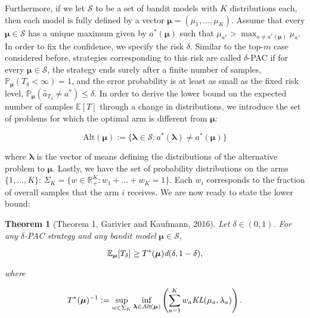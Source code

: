 \documentclass[11pt,]{article}
\newtheorem{theorem}{Theorem}
\begin{document}
Furthermore, if we let \(\mathcal{S}\) to be a set of bandit models with
\(K\) distributions each, then each model is fully defined by a vector
\(\bm{\mu} = (\mu_1, \dots, \mu_K)\). Assume that every
\(\bm{\mu} \in \mathcal{S}\) has a unique maximum given by
\(a^*(\bm{\mu})\) such that
\(\mu_{a^*} > \max_{a \neq a^*(\bm{\mu})} \mu_a\). In order to fix the
confidence, we specify the risk \(\delta\). Similar to the top-\(m\)
case considered before, strategies corresponding to this risk are called
\(\delta\)-PAC if for every \(\bm{\mu} \in \mathcal{S}\), the strategy
ends surely after a finite number of samples,
\(\mathbb{P}_{\bm{\mu}}(T_{\delta} < \infty) = 1\), and the error
probability is at least as small as the fixed risk level,
\(\mathbb{P}_{\bm{\mu}}(\hat{a}_{T_{\delta}} \neq a^*) \leq \delta\). In
order to derive the lower bound on the expected number of samples
\(\mathbb{E}[T]\) through a change in distributions, we introduce the
set of problems for which the optimal arm is different from
\(\bm{\mu}\):

\begin{equation*}
\text{Alt}(\bm{\mu}) := \{\bm{\lambda} \in \mathcal{S}: a^*(\bm{\lambda}) \neq a^*(\bm{\mu})\}
\end{equation*}

where \(\bm{\lambda}\) is the vector of means defining the distributions
of the alternative problem to \(\bm{\mu}\). Lastly, we have the set of
probability distributions on the arms \(\{1,...,K\}\):
\(\Sigma_K = \{w \in \mathbb{R}_{+}^K: w_1 + \dots + w_K = 1\}\). Each
\(w_i\) corresponds to the fraction of overall samples that the arm
\(i\) receives. We are now ready to state the lower bound:

\begin{theorem}[Theorem 1, Garivier and Kaufmann, 2016] \label{theorem:GarivierKaufmannTheorem1}
Let $\delta \in (0,1)$. For any $\delta$-PAC strategy and any bandit model $\bm{\mu} \in \mathcal{S}$,

\begin{equation*}
\mathbb{E}_{\bm{\mu}} [T_{\delta}] \geq T^*(\bm{\mu}) \text{\em{d}}(\delta,1-\delta),
\end{equation*}

where 

\begin{equation} \label{eq:GarivierKaufmann_Theorem1_Game}
T^*(\bm{\mu})^{-1} := \sup_{w \in \Sigma_K} \inf_{\bm{\lambda} \in \text{\em{Alt}}(\bm{\mu})} \left( \sum_{a=1}^K w_a \text{\em{KL}}(\mu_a, \lambda_a)\right).
\end{equation}
\end{theorem}
\end{document}
